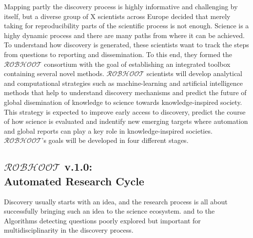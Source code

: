 \documentclass[12pt, a4paper]{article} %
\begin{document}

      Mapping partly the discovery process is highly informative and
      challenging by itself, but a diverse group of X scientists
      across Europe decided that merely taking for reproducibility
      parts of the scientific process is not enough. Science is a
      highy dynamic process and there are many paths from where it can
      be achieved. To understand how discovery is generated, these
      scientists want to track the steps from questions to reporting
      and dissemination. To this end, they formed the
      $\mathcal{ROBHOOT}$ consortium with the goal of establishing an
      integrated toolbox containing several novel
      methods. $\mathcal{ROBHOOT}$ scientists will develop analytical
      and computational strategies such as machine-learning and
      artificial intelligence methods that help to understand
      discovery mechanisms and predict the future of global
      disemination of knowledge to science towards knowledge-inspired
      society. This strategy is expected to improve early access to
      discovery, predict the course of how science is evaluated and
      indentify new emerging targets where automation and global
      reports can play a key role in knowledge-inspired
      societies. $\mathcal{ROBHOOT}$'s goals will be developed in four
      different stages.

  \subsection{{\bf $\mathcal{ROBHOOT}$ v.1.0}: \\Automated Research Cycle}
  Discovery usually starts with an idea, and the research process is
  all about successfully bringing such an idea to the science
  ecosystem. and to the Algorithms detecting questions poorly explored
  but important for multidisciplinarity in the discovery process.
\end{document}
